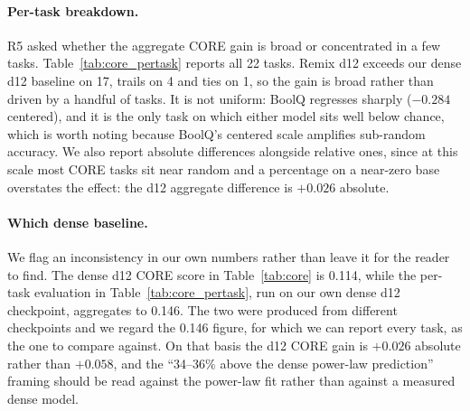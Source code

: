 \documentclass{article}
\begin{document}
\paragraph{Per-task breakdown.} R5 asked whether the aggregate CORE gain is broad or concentrated in a few tasks. Table~\ref{tab:core_pertask} reports all 22 tasks. Remix d12 exceeds our dense d12 baseline on 17, trails on 4 and ties on 1, so the gain is broad rather than driven by a handful of tasks. It is not uniform: BoolQ regresses sharply ($-0.284$ centered), and it is the only task on which either model sits well below chance, which is worth noting because BoolQ's centered scale amplifies sub-random accuracy. We also report absolute differences alongside relative ones, since at this scale most CORE tasks sit near random and a percentage on a near-zero base overstates the effect: the d12 aggregate difference is $+0.026$ absolute.

\paragraph{Which dense baseline.} We flag an inconsistency in our own numbers rather than leave it for the reader to find. The dense d12 CORE score in Table~\ref{tab:core} is 0.114, while the per-task evaluation in Table~\ref{tab:core_pertask}, run on our own dense d12 checkpoint, aggregates to 0.146. The two were produced from different checkpoints and we regard the 0.146 figure, for which we can report every task, as the one to compare against. On that basis the d12 CORE gain is $+0.026$ absolute rather than $+0.058$, and the ``34--36\% above the dense power-law prediction'' framing should be read against the power-law fit rather than against a measured dense model.
\end{document}
